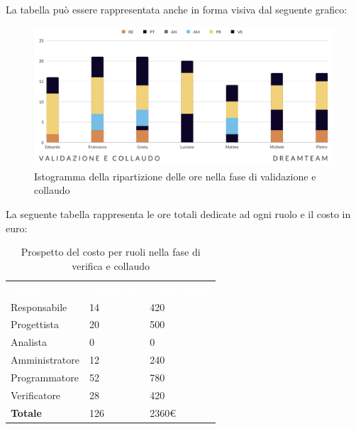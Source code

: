 La tabella può essere rappresentata anche in forma visiva dal seguente grafico:
\begin{figure}[H]
\centering
\includegraphics[scale=0.65]{Sezioni/SezioniPreventivo/grafici/Validazione_collaudo.png}
\caption{Istogramma della ripartizione delle ore  nella fase di validazione e collaudo}
\end{figure}

La seguente tabella rappresenta le ore totali dedicate ad ogni ruolo e il costo in euro:

\begin{table}[H]
\begin{center}
\renewcommand{\arraystretch}{1.5}
\begin{tabular}{ m{}<{\centering}  m{}<{\centering} m{}<{\centering}}
	\rowcolor{darkblue}
	\textcolor{white}{\textbf{Ruolo}}&\textcolor{white}{\textbf{Totale ore}}&\textcolor{white}{\textbf{Costo totale}}\\ 

	Responsabile  & 14 & 420 \\	
	
	Progettista & 20 & 500 \\
	
	Analista & 0 & 0 \\

	Amministratore & 12 & 240 \\
	
	Programmatore & 52 & 780 \\
	
	Verificatore & 28 & 420 \\
	
	\textbf{Totale} & 126 & 2360\euro \\
	
\end{tabular}
\caption{Prospetto del costo per ruoli nella fase di verifica e collaudo}
\end{center}
\end{table}

